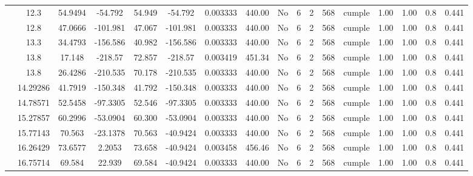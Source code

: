 \begin{table}[H]
{\begin{tabular}{|c|c|c|c|c|c|c|c|c|c|c|c|c|c|c|c|c|}
\cline{2-17}        & 12.3 & 54.9494 & -54.792 & 54.949 & -54.792 & 0.003333 & 440.00 & No  & 6   & 2   & 568 & \cellcolor[rgb]{ .776,  .937,  .808}cumple & 1.00 & 1.00 & 0.8 & 0.441 \bigstrut\\
\cline{2-17}        & 12.8 & 47.0666 & -101.981 & 47.067 & -101.981 & 0.003333 & 440.00 & No  & 6   & 2   & 568 & \cellcolor[rgb]{ .776,  .937,  .808}cumple & 1.00 & 1.00 & 0.8 & 0.441 \bigstrut\\
\cline{2-17}        & 13.3 & 34.4793 & -156.586 & 40.982 & -156.586 & 0.003333 & 440.00 & No  & 6   & 2   & 568 & \cellcolor[rgb]{ .776,  .937,  .808}cumple & 1.00 & 1.00 & 0.8 & 0.441 \bigstrut\\
\cline{2-17}        & 13.8 & 17.148 & -218.57 & 72.857 & -218.57 & 0.003419 & 451.34 & No  & 6   & 2   & 568 & \cellcolor[rgb]{ .776,  .937,  .808}cumple & 1.00 & 1.00 & 0.8 & 0.441 \bigstrut\\
\cline{2-17}        & 13.8 & 26.4286 & -210.535 & 70.178 & -210.535 & 0.003333 & 440.00 & No  & 6   & 2   & 568 & \cellcolor[rgb]{ .776,  .937,  .808}cumple & 1.00 & 1.00 & 0.8 & 0.441 \bigstrut\\
\cline{2-17}        & 14.29286 & 41.7919 & -150.348 & 41.792 & -150.348 & 0.003333 & 440.00 & No  & 6   & 2   & 568 & \cellcolor[rgb]{ .776,  .937,  .808}cumple & 1.00 & 1.00 & 0.8 & 0.441 \bigstrut\\
\cline{2-17}        & 14.78571 & 52.5458 & -97.3305 & 52.546 & -97.3305 & 0.003333 & 440.00 & No  & 6   & 2   & 568 & \cellcolor[rgb]{ .776,  .937,  .808}cumple & 1.00 & 1.00 & 0.8 & 0.441 \bigstrut\\
\cline{2-17}        & 15.27857 & 60.2996 & -53.0904 & 60.300 & -53.0904 & 0.003333 & 440.00 & No  & 6   & 2   & 568 & \cellcolor[rgb]{ .776,  .937,  .808}cumple & 1.00 & 1.00 & 0.8 & 0.441 \bigstrut\\
\cline{2-17}        & 15.77143 & 70.563 & -23.1378 & 70.563 & -40.9424 & 0.003333 & 440.00 & No  & 6   & 2   & 568 & \cellcolor[rgb]{ .776,  .937,  .808}cumple & 1.00 & 1.00 & 0.8 & 0.441 \bigstrut\\
\cline{2-17}        & 16.26429 & 73.6577 & 2.2053 & 73.658 & -40.9424 & 0.003458 & 456.46 & No  & 6   & 2   & 568 & \cellcolor[rgb]{ .776,  .937,  .808}cumple & 1.00 & 1.00 & 0.8 & 0.441 \bigstrut\\
\cline{2-17}        & 16.75714 & 69.584 & 22.939 & 69.584 & -40.9424 & 0.003333 & 440.00 & No  & 6   & 2   & 568 & \cellcolor[rgb]{ .776,  .937,  .808}cumple & 1.00 & 1.00 & 0.8 & 0.441 \bigstrut\\

\end{tabular}}
\end{table}
